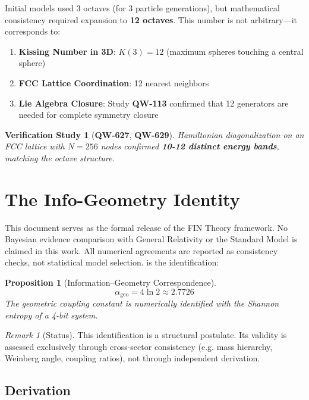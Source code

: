 \documentclass[11pt,a4paper]{book}
\newtheorem{proposition}[theorem]{Proposition}
\newtheorem{verification}{Verification Study}[section]
\theoremstyle{remark}
\newtheorem{remark}{Remark}[section]
\newcommand{\alphageo}{\alpha_{\text{geo}}}
\newcommand{\QW}[1]{\textbf{QW-#1}}
\begin{document}
Initial models used 3 octaves (for 3 particle generations), but mathematical consistency required expansion to \textbf{12 octaves}. This number is not arbitrary—it corresponds to:

\begin{enumerate}
    \item \textbf{Kissing Number in 3D}: $K(3) = 12$ (maximum spheres touching a central sphere)
    \item \textbf{FCC Lattice Coordination}: 12 nearest neighbors
    \item \textbf{Lie Algebra Closure}: Study \QW{113} confirmed that 12 generators are needed for complete symmetry closure
\end{enumerate}

\begin{verification}[\QW{627}, \QW{629}]
Hamiltonian diagonalization on an FCC lattice with $N=256$ nodes confirmed \textbf{10-12 distinct energy bands}, matching the octave structure.
\end{verification}

\section{The Info-Geometry Identity}

This document serves as the formal release of the FIN Theory framework.
No Bayesian evidence comparison with General Relativity or the Standard Model is claimed in this work. All numerical agreements are reported as consistency checks, not statistical model selection. is the identification:

\begin{proposition}[Information--Geometry Correspondence]
\begin{equation}
\boxed{\alphageo = 4 \ln 2 \approx 2.7726}
\label{eq:info_geo_identity}
\end{equation}
The geometric coupling constant is numerically identified with the Shannon entropy of a 4-bit system.
\end{proposition}

\begin{remark}[Status]
This identification is a structural postulate. Its validity is assessed exclusively through cross-sector consistency (e.g. mass hierarchy, Weinberg angle, coupling ratios), not through independent derivation.
\end{remark}

\subsection{Derivation}
\end{document}
